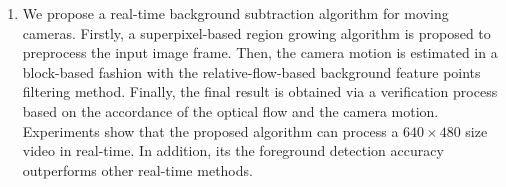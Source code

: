 \begin{eabstract}
\begin{enumerate}
   \item We propose a real-time background subtraction algorithm for moving cameras. Firstly, a superpixel-based region growing algorithm is proposed to preprocess the input image frame. Then, the camera motion is estimated in a block-based fashion with the relative-flow-based background feature points filtering method. Finally, the final result is obtained via a verification process based on the accordance of the optical flow and the camera motion. Experiments show that the proposed algorithm can process a $640 \times 480$ size video in real-time. In addition, its the foreground detection accuracy outperforms other real-time methods.
   \end{enumerate}

\end{eabstract}

